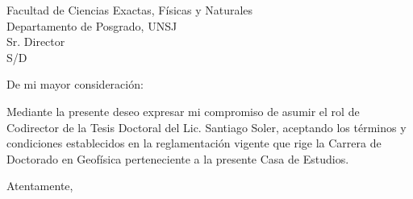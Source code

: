 \documentclass[a4paper,12pt]{letter}
\date{San Juan, 31 de Marzo de 2017}
\begin{document}
	
\makeatletter %
  \def\@texttop{}
\makeatother

\begin{letter}{Facultad de Ciencias Exactas, Físicas y Naturales\\ Departamento de Posgrado, UNSJ\\ Sr. Director\\ S/D}

\opening{De mi mayor consideración:}

\setlength{\parindent}{1cm}

Mediante la presente deseo expresar mi compromiso de asumir el rol de Codirector de la Tesis Doctoral del Lic. Santiago Soler, aceptando los términos y condiciones establecidos en la reglamentación vigente que rige la Carrera de Doctorado en Geofísica perteneciente a la presente Casa de Estudios.

\closing{Atentamente,}

\end{letter}
\end{document}
